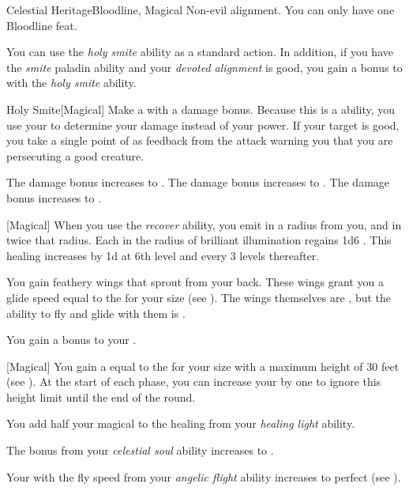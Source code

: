     \begin{feat}{Celestial Heritage}{Bloodline, Magical}
        \featpre Non-evil alignment.
         You can only have one Bloodline feat.

         You can use the \textit{holy smite} ability as a standard action.
        In addition, if you have the \textit{smite} paladin ability and your \textit{devoted alignment} is good, you gain a  bonus to  with the \textit{holy smite} ability.
        \begin{freeability}{Holy Smite}[Magical]
            Make a  with a  damage bonus.
            Because this is a  ability, you use your   to determine your damage instead of your  power.
            If your target is good, you take a single point of  as feedback from the attack warning you that you are persecuting a good creature.

            \rankline
             The damage bonus increases to .
             The damage bonus increases to .
             The damage bonus increases to .
        \end{freeability}

        [Magical] When you use the \textit{recover} ability, you  emit  in a \medarea radius from you, and  in twice that radius.
        Each  in the radius of brilliant illumination regains 1d6 .
        This healing increases by \plus1d at 6th level and every 3 levels thereafter.

         You gain feathery wings that sprout from your back.
        These wings grant you a glide speed equal to the  for your size (see ).
        The wings themselves are , but the ability to fly and glide with them is .

         You gain a  bonus to your .

        [Magical] You gain a  equal to the  for your size with a maximum height of 30 feet (see ).
        At the start of each phase, you can increase your  by one to ignore this height limit until the end of the round.

         You add half your magical  to the healing from your \textit{healing light} ability.

         The bonus from your \textit{celestial soul} ability increases to .

         Your  with the fly speed from your \textit{angelic flight} ability increases to perfect (see ).
    \end{feat}

